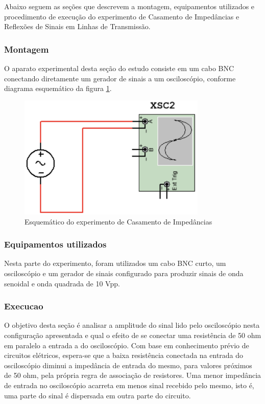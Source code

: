 \documentclass[12pt]{article}
\begin{document}
Abaixo seguem as seções que descrevem a montagem, equipamentos
utilizados e procedimento de execução do experimento de Casamento de
Impedâncias e Reflexões de Sinais em Linhas de Transmissão.

\subsubsection{Montagem}
O aparato experimental desta seção do estudo consiste em um cabo BNC conectando
diretamente um gerador de sinais a um osciloscópio, conforme diagrama
esquemático da figura \ref{fig:img/circuito2.png}.

\begin{figure}[H]
  \centering
  \includegraphics[width=0.8\textwidth]{img/circuito2.png}
  \caption{Esquemático do experimento de Casamento de Impedâncias}
  \label{fig:img/circuito2.png}
\end{figure}

\subsubsection{Equipamentos utilizados}
Nesta parte do experimento, foram utilizados um cabo BNC curto, um
osciloscópio e um gerador de sinais configurado para produzir sinais
de onda senoidal e onda quadrada de 10 Vpp.

\subsubsection{Execucao}
O objetivo desta seção é analisar a amplitude do sinal lido pelo
osciloscópio nesta configuração apresentada e qual o efeito de se
conectar uma resistência de 50 ohm em paralelo a entrada a do
osciloscópio. Com base em conhecimento prévio de circuitos elétricos,
espera-se que a baixa resistência conectada na entrada do
osciloscópio diminui a impedância de entrada do mesmo, para valores
próximos de 50 ohm, pela própria regra de associação de resistores.
Uma menor impedância de entrada no osciloscópio acarreta em menos
sinal recebido pelo mesmo, isto é, uma parte do sinal é dispersada em
outra parte do circuito.
\end{document}
